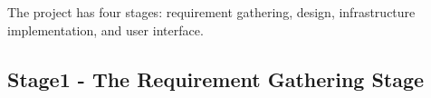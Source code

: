 \documentclass[10pt,conference]{IEEEtran}
\begin{document}
The project has four stages: requirement gathering, design, infrastructure
implementation, and user interface.

\subsection{Stage1 - The Requirement Gathering Stage}
\label{sec:requirement-gathering-stage}


%

%

%

%




\nocite{*}
\end{document}
